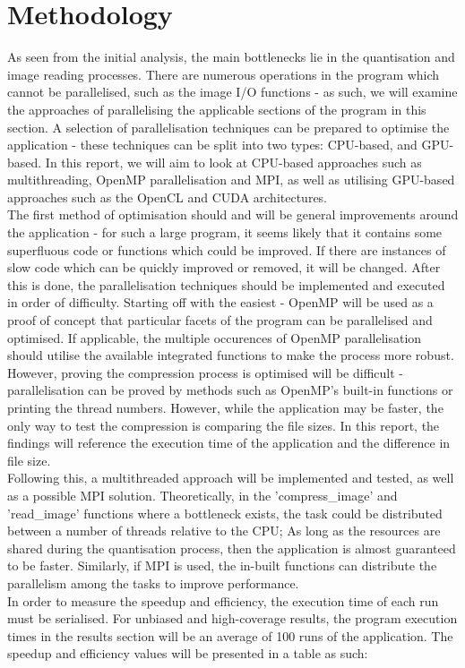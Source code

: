 \documentclass[12pt, a4paper]{article}
\begin{document}
\section{Methodology}
As seen from the initial analysis, the main bottlenecks lie in the quantisation and image reading processes. There are numerous operations in the program which cannot be parallelised, such as the image I/O functions - as such, we will examine the approaches of parallelising the applicable sections of the program in this section. A selection of parallelisation techniques can be prepared to optimise the application - these techniques can be split into two types: CPU-based, and GPU-based. In this report, we will aim to look at CPU-based approaches such as multithreading, OpenMP parallelisation and MPI, as well as utilising GPU-based approaches such as the OpenCL and CUDA architectures. \\
The first method of optimisation should and will be general improvements around the application - for such a large program, it seems likely that it contains some superfluous code or functions which could be improved. If there are instances of slow code which can be quickly improved or removed, it will be changed. After this is done, the parallelisation techniques should be implemented and executed in order of difficulty. Starting off with the easiest - OpenMP will be used as a proof of concept that particular facets of the program can be parallelised and optimised. If applicable, the multiple occurences of OpenMP parallelisation should utilise the available integrated functions to make the process more robust. However, proving the compression process is optimised will be difficult - parallelisation can be proved by methods such as OpenMP's built-in functions or printing the thread numbers. However, while the application may be faster, the only way to test the compression is comparing the file sizes. In this report, the findings will reference the execution time of the application and the difference in file size. \\
Following this, a multithreaded approach will be implemented and tested, as well as a possible MPI solution. Theoretically, in the 'compress\_image' and 'read\_image' functions where a bottleneck exists, the task could be distributed between a number of threads relative to the CPU; As long as the resources are shared during the quantisation process, then the application is almost guaranteed to be faster. Similarly, if MPI is used, the in-built functions can distribute the parallelism among the tasks to improve performance. \\
In order to measure the speedup and efficiency, the execution time of each run must be serialised. For unbiased and high-coverage results, the program execution times in the results section will be an average of 100 runs of the application. The speedup and efficiency values will be presented in a table as such: \\
\end{document}
